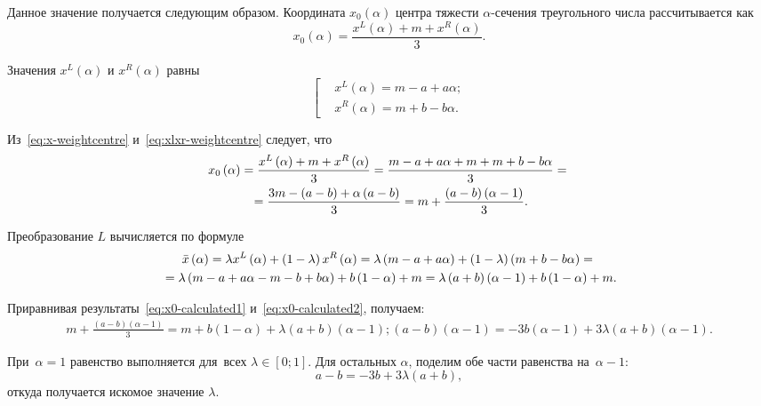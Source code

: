 Данное значение получается следующим образом. Координата $x_0 \left( \alpha  \right)$ центра тяжести $\alpha$-сечения треугольного числа рассчитывается как
\begin{equation}
\label{eq:x-weightcentre}
  x_0\left( \alpha  \right)=\frac{x^L\left( \alpha  \right)+m+x^R\left( \alpha  \right)}{3}.
\end{equation}

Значения $x^L\left( \alpha  \right)$ и $x^R\left( \alpha \right)$ равны
\begin{equation}
\label{eq:xlxr-weightcentre}
  \left[ \begin{aligned}
    & x^L\left( \alpha  \right)=m-a+a\alpha; \\ 
    & x^R\left( \alpha  \right)=m+b-b\alpha.
  \end{aligned} \right.
\end{equation}

Из~\eqref{eq:x-weightcentre} и~\eqref{eq:xlxr-weightcentre} следует, что
\begin{gather}
  x_0\left( \alpha  \right)=\frac{x^L\left( \alpha  \right)+m+x^R\left( \alpha  \right)}{3}=\frac{m-a+a\alpha +m+m+b-b\alpha }{3}={} \notag \\ 
  \label{eq:x0-calculated1}
  {}=\frac{3m-\left( a-b \right)+\alpha \left( a-b \right)}{3}=m+\frac{\left( a-b \right)\left( \alpha -1 \right)}{3}.
\end{gather}

Преобразование $L$ вычисляется по формуле
\begin{gather}
  \bar{x}\left( \alpha  \right)=\lambda x^L\left( \alpha  \right)+\left( 1-\lambda  \right)x^R\left( \alpha  \right)=\lambda \left( m-a+a\alpha  \right)+\left( 1-\lambda  \right)\left( m+b-b\alpha  \right)={} \notag \\ 
  \label{eq:x0-calculated2}
  {} =\lambda \left( m-a+a\alpha -m-b+b\alpha  \right)+b\left( 1-\alpha  \right)+m=\lambda \left( a+b \right)\left( \alpha -1 \right)+b\left( 1-\alpha  \right)+m.
\end{gather}

Приравнивая результаты~\eqref{eq:x0-calculated1} и~\eqref{eq:x0-calculated2}, получаем:
\begin{gather*}
  m+\frac{\left( a-b \right)\left( \alpha -1 \right)}{3}=m+b\left( 1-\alpha  \right)+\lambda \left( a+b \right)\left( \alpha -1 \right);
  \left( a-b \right)\left( \alpha -1 \right)=-3b\left( \alpha -1 \right)+3\lambda \left( a+b \right)\left( \alpha -1 \right).  
\end{gather*}
 
При~$\alpha=1$ равенство выполняется для~всех $\lambda \in \left[ 0; 1\right]$. Для остальных $\alpha$, поделим обе части равенства на~$\alpha-1$:
\begin{equation*}
  a-b=-3b+3\lambda \left( a+b \right),
\end{equation*}
откуда получается искомое значение $\lambda$.